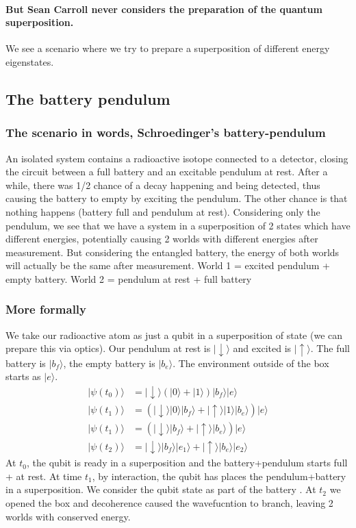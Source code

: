 \documentclass{article}
\begin{document}
\paragraph{But Sean Carroll never considers the preparation of the quantum superposition.} We see a scenario where we try to prepare a superposition of different energy eigenstates. 

\subsection{The battery pendulum}

\subsubsection{The scenario in words, Schroedinger's battery-pendulum}

An isolated system contains a radioactive isotope connected to a detector, closing the circuit between a full battery and an excitable pendulum at rest. After a while, there was 1/2 chance of a decay happening and being detected, thus causing the battery to empty by exciting the pendulum. The other chance is that nothing happens (battery full and pendulum at rest). Considering only the pendulum, we see that we have a system in a superposition of 2 states which have different energies, potentially causing 2 worlds with different energies after measurement. But considering the entangled battery, the energy of both worlds will actually be the same after measurement. World 1 = excited pendulum + empty battery. World 2 = pendulum at rest + full battery 

\subsubsection{More formally}
We take our radioactive atom as just a qubit in a superposition of state (we can prepare this via optics). Our pendulum at rest is $|\downarrow\rangle$ and excited is $|\uparrow\rangle$. The full battery is $|b_f\rangle$, the empty battery is $|b_e\rangle$. The environment outside of the box starts as $|e\rangle$.
\begin{align}
    |\psi(t_0)\rangle&=|\downarrow\rangle(|0\rangle+|1\rangle)|b_f\rangle|e\rangle\\
    |\psi(t_1)\rangle&=(|\downarrow\rangle|0\rangle|b_f\rangle+|\uparrow\rangle|1\rangle|b_e\rangle)|e\rangle\\
    |\psi(t_1)\rangle&=(|\downarrow\rangle|b_f\rangle+|\uparrow\rangle|b_e\rangle)|e\rangle\\
    |\psi(t_2)\rangle&=|\downarrow\rangle|b_f\rangle|e_1\rangle+|\uparrow\rangle|b_e\rangle|e_2\rangle
\end{align}
At $t_0$, the qubit is ready in a superposition and the battery+pendulum starts full + at rest. At time $t_1$, by interaction, the qubit has places the pendulum+battery in a superposition. We consider the qubit state as part of the battery . At $t_2$ we opened the box and decoherence caused the wavefucntion to branch, leaving 2 worlds with conserved energy.
\end{document}
